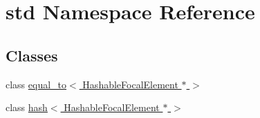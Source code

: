 \hypertarget{namespacestd}{}\section{std Namespace Reference}
\label{namespacestd}
\subsection*{Classes}
\begin{DoxyCompactItemize}
\item 
class \hyperlink{classstd_1_1equal__to_3_01HashableFocalElement_01_5_01_4}{equal\+\_\+to$<$ Hashable\+Focal\+Element $\ast$ $>$}
\item 
class \hyperlink{classstd_1_1hash_3_01HashableFocalElement_01_5_01_4}{hash$<$ Hashable\+Focal\+Element $\ast$ $>$}
\end{DoxyCompactItemize}
